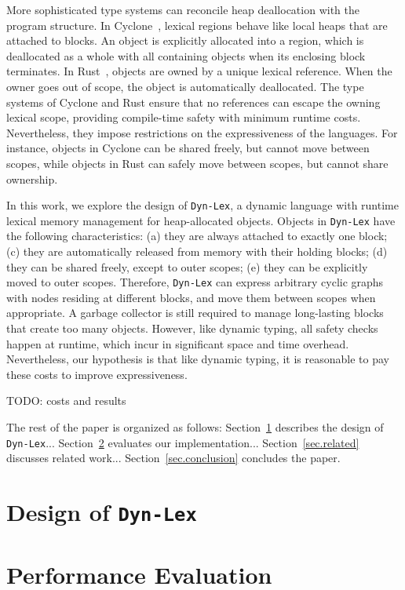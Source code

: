 \documentclass[12pt]{article}
\newcommand{\lex} {\texttt{Dyn-Lex}\xspace}
\begin{document}
More sophisticated type systems can reconcile heap deallocation with the
program structure.
%
In Cyclone~\cite{cyclone.regions}, lexical regions behave like local heaps that
are attached to blocks.
An object is explicitly allocated into a region, which is deallocated as a
whole with all containing objects when its enclosing block terminates.
%
In Rust~\cite{rust.book}, objects are owned by a unique lexical reference.
When the owner goes out of scope, the object is automatically deallocated.
%
The type systems of Cyclone and Rust ensure that no references can escape the
owning lexical scope, providing compile-time safety with minimum runtime
costs.
%
Nevertheless, they impose restrictions on the expressiveness of the languages.
For instance, objects in Cyclone can be shared freely, but cannot move between
scopes, while objects in Rust can safely move between scopes, but cannot share
ownership.

In this work, we explore the design of \lex, a dynamic language with runtime
lexical memory management for heap-allocated objects.
%
Objects in \lex have the following characteristics:
    (a) they are always attached to exactly one block;
    (c) they are automatically released from memory with their holding blocks;
    (d) they can be shared freely, except to outer scopes;
    (e) they can be explicitly moved to outer scopes.
%
Therefore, \lex can express arbitrary cyclic graphs with nodes residing at
different blocks, and move them between scopes when appropriate.
A garbage collector is still required to manage long-lasting blocks that create
too many objects.
%
However, like dynamic typing, all safety checks happen at runtime, which incur
in significant space and time overhead.
Nevertheless, our hypothesis is that like dynamic typing, it is reasonable to
pay these costs to improve expressiveness.

TODO: costs and results

The rest of the paper is organized as follows:
Section~\ref{sec.design} describes the design of \lex...
Section~\ref{sec.eval} evaluates our implementation...
Section~\ref{sec.related} discusses related work...
Section~\ref{sec.conclusion} concludes the paper.

\section{Design of \lex}
\label{sec.design}

\section{Performance Evaluation}
\label{sec.eval}
\end{document}
